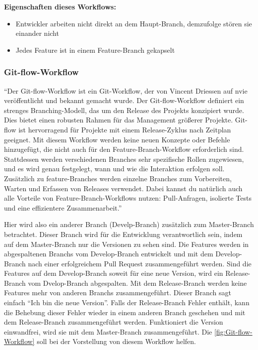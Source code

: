 \textbf{Eigenschaften dieses Workflows:}
\begin{itemize}
	\item Entwickler arbeiten nicht direkt an dem Haupt-Branch, demzufolge stören sie einander nicht
	\item Jedes Feature ist in einem Feature-Branch gekapselt
\end{itemize}

\subsubsection{Git-flow-Workflow}
\label{subsubsec:Git-flow-Workflow}

"`Der Git-flow-Workflow ist ein Git-Workflow, der von Vincent Driessen auf nvie veröffentlicht und bekannt gemacht wurde. Der Git-flow-Workflow definiert ein strenges Branching-Modell, das um den Release des Projekts konzipiert wurde. Dies bietet einen robusten Rahmen für das Management größerer Projekte.
Git-flow ist hervorragend für Projekte mit einem Release-Zyklus nach Zeitplan geeignet. Mit diesem Workflow werden keine neuen Konzepte oder Befehle hinzugefügt, die nicht auch für 		den Feature-Branch-Workflow erforderlich sind. Stattdessen werden verschiedenen Branches sehr spezifische Rollen zugewiesen, und es wird genau festgelegt, wann und wie die 				Interaktion erfolgen soll. Zusätzlich zu feature-Branches werden einzelne Branches zum Vorbereiten, Warten und Erfassen von Releases verwendet. Dabei kannst du natürlich auch alle 		Vorteile von Feature-Branch-Workflows nutzen: Pull-Anfragen, isolierte Tests und eine effizientere Zusammenarbeit."' \cite{Git-flow-Workflow}

Hier wird also ein anderer Branch (Develp-Branch) zusätzlich zum Master-Branch betrachtet. Dieser Branch wird für die Entwicklung verantwortlich sein, indem auf dem Master-Branch 			nur die Versionen zu sehen sind. Die Features werden in abgespaltenen Branchs vom Develop-Branch entwickelt und mit dem Develop-Branch nach einer erfolgreichem Pull Request 				zusammengeführt werden. Sind die Features auf dem Develop-Branch soweit für eine neue Version, wird ein Release-Branch vom Dvelop-Branch abgespalten. Mit dem Release-Branch werden keine 			Features mehr von anderen Branchs zusammengeführt. Dieser Branch sagt einfach "`Ich bin die neue Version"'. Falls der Release-Branch Fehler enthält, kann die Behebung dieser			Fehler wieder in einem anderen Branch geschehen und mit dem Release-Branch zusammengeführt werden. Funktioniert die Version einwandfrei, wird sie mit dem Master-Branch 						zusammengeführt. Die \cref{fig:Git-flow-Workflow} soll bei der Vorstellung von diesem Workflow helfen.

